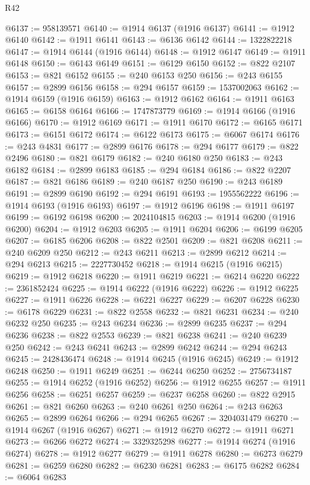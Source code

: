 \begin{lexlean}{R42}
\begin{coremodule}
{@6137 := 958139571
@6140 := @1914 @6137 (@1916 @6137)
@6141 := @1912 @6140
@6142 := @1911 @6141
@6143 := @6136 @6142
@6144 := 1322822218
@6147 := @1914 @6144 (@1916 @6144)
@6148 := @1912 @6147
@6149 := @1911 @6148
@6150 := @6143 @6149
@6151 := @6129 @6150
@6152 := @822 @2107
@6153 := @821 @6152
@6155 := @240 @6153 @250
@6156 := @243 @6155
@6157 := @2899 @6156
@6158 := @294 @6157
@6159 := 1537002063
@6162 := @1914 @6159 (@1916 @6159)
@6163 := @1912 @6162
@6164 := @1911 @6163
@6165 := @6158 @6164
@6166 := 1747873779
@6169 := @1914 @6166 (@1916 @6166)
@6170 := @1912 @6169
@6171 := @1911 @6170
@6172 := @6165 @6171
@6173 := @6151 @6172
@6174 := @6122 @6173
@6175 := @6067 @6174
@6176 := @243 @4831
@6177 := @2899 @6176
@6178 := @294 @6177
@6179 := @822 @2496
@6180 := @821 @6179
@6182 := @240 @6180 @250
@6183 := @243 @6182
@6184 := @2899 @6183
@6185 := @294 @6184
@6186 := @822 @2207
@6187 := @821 @6186
@6189 := @240 @6187 @250
@6190 := @243 @6189
@6191 := @2899 @6190
@6192 := @294 @6191
@6193 := 1955562222
@6196 := @1914 @6193 (@1916 @6193)
@6197 := @1912 @6196
@6198 := @1911 @6197
@6199 := @6192 @6198
@6200 := 2024104815
@6203 := @1914 @6200 (@1916 @6200)
@6204 := @1912 @6203
@6205 := @1911 @6204
@6206 := @6199 @6205
@6207 := @6185 @6206
@6208 := @822 @2501
@6209 := @821 @6208
@6211 := @240 @6209 @250
@6212 := @243 @6211
@6213 := @2899 @6212
@6214 := @294 @6213
@6215 := 2227730452
@6218 := @1914 @6215 (@1916 @6215)
@6219 := @1912 @6218
@6220 := @1911 @6219
@6221 := @6214 @6220
@6222 := 2361852424
@6225 := @1914 @6222 (@1916 @6222)
@6226 := @1912 @6225
@6227 := @1911 @6226
@6228 := @6221 @6227
@6229 := @6207 @6228
@6230 := @6178 @6229
@6231 := @822 @2558
@6232 := @821 @6231
@6234 := @240 @6232 @250
@6235 := @243 @6234
@6236 := @2899 @6235
@6237 := @294 @6236
@6238 := @822 @2553
@6239 := @821 @6238
@6241 := @240 @6239 @250
@6242 := @243 @6241
@6243 := @2899 @6242
@6244 := @294 @6243
@6245 := 2428436474
@6248 := @1914 @6245 (@1916 @6245)
@6249 := @1912 @6248
@6250 := @1911 @6249
@6251 := @6244 @6250
@6252 := 2756734187
@6255 := @1914 @6252 (@1916 @6252)
@6256 := @1912 @6255
@6257 := @1911 @6256
@6258 := @6251 @6257
@6259 := @6237 @6258
@6260 := @822 @2915
@6261 := @821 @6260
@6263 := @240 @6261 @250
@6264 := @243 @6263
@6265 := @2899 @6264
@6266 := @294 @6265
@6267 := 3204031479
@6270 := @1914 @6267 (@1916 @6267)
@6271 := @1912 @6270
@6272 := @1911 @6271
@6273 := @6266 @6272
@6274 := 3329325298
@6277 := @1914 @6274 (@1916 @6274)
@6278 := @1912 @6277
@6279 := @1911 @6278
@6280 := @6273 @6279
@6281 := @6259 @6280
@6282 := @6230 @6281
@6283 := @6175 @6282
@6284 := @6064 @6283
}
\end{coremodule}
\end{lexlean}
